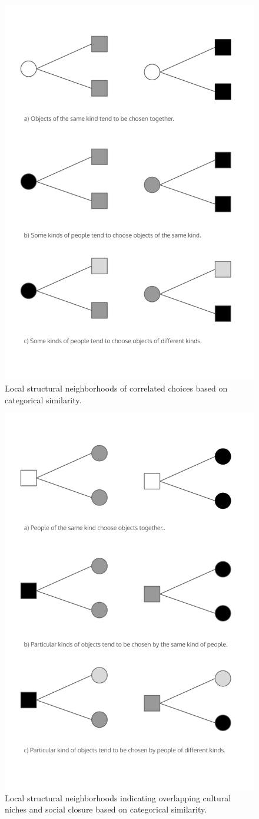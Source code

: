 \documentclass[preprint,12pt,authoryear]{elsarticle}
\begin{document}
\newpage

\begin{figure}
    \centering
    \includegraphics[width=0.8\linewidth]{Figs/local-struct2.png}
    \caption{Local structural neighborhoods of correlated choices based on categorical similarity.}
    \label{fig:local-struct2}
\end{figure}

\newpage

\begin{figure}
    \centering
    \includegraphics[width=0.8\linewidth]{Figs/local-struct3.png}
    \caption{Local structural neighborhoods indicating overlapping cultural niches and social closure based on categorical similarity.}
    \label{fig:local-struct2}
\end{figure}
\end{document}
